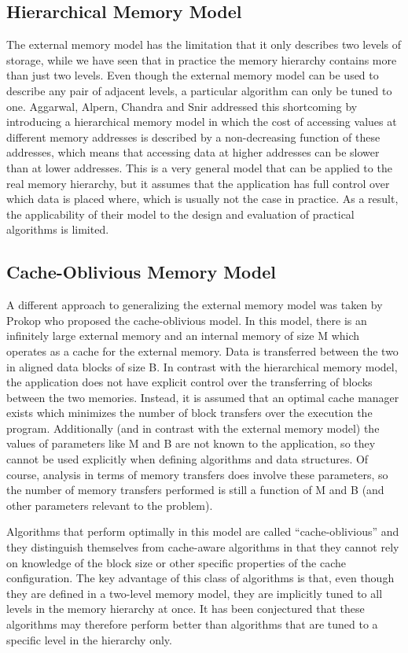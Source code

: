 \documentclass{acm_proc_article-sp}
\begin{document}
\subsection{Hierarchical Memory Model}
The external memory model has the limitation that it only describes two levels of storage, while we have seen that in practice the memory hierarchy contains more than just two levels. Even though the external memory model can be used to describe any pair of adjacent levels, a particular algorithm can only be tuned to one.
Aggarwal, Alpern, Chandra and Snir \cite{aggarwal1987mhm} addressed this
shortcoming by introducing a hierarchical memory model in which the cost of
accessing values at different memory addresses is described by a non-decreasing
function of these addresses, which means that accessing data at higher
addresses can be slower than at lower addresses.
This is a very general model that can be applied to the real memory hierarchy,
but it assumes that the application has full control over which data is placed
where, which is usually not the case in practice.
As a result, the applicability of their model to the design and evaluation of
practical algorithms is limited.

\subsection{Cache-Oblivious Memory Model}
A different approach to generalizing the external memory model was taken by Prokop \cite{prokop1999coa} who proposed the cache-oblivious model.
In this model, there is an infinitely large external memory and an internal memory of size M which operates as a cache for the external memory.
Data is transferred between the two in aligned data blocks of size B.
In contrast with the hierarchical memory model, the application does not have explicit control over the transferring of blocks between the two memories.
Instead, it is assumed that an optimal cache manager exists which minimizes the number of block transfers over the execution the program.
Additionally (and in contrast with the external memory model) the values of parameters like M and B are not known to the application, so they cannot be used explicitly when defining algorithms and data structures.
Of course, analysis in terms of memory transfers does involve these parameters, so the number of memory transfers performed is still a function of M and B (and other parameters relevant to the problem).

Algorithms that perform optimally in this model are called ``cache-oblivious'' and they distinguish themselves from cache-aware algorithms in that they cannot rely on knowledge of the block size or other specific properties of the cache configuration. The key advantage of this class of algorithms is that, even though they are defined in a two-level memory model, they are implicitly tuned to all levels in the memory hierarchy at once. It has been conjectured that these algorithms may therefore perform better than algorithms that are tuned to a specific level in the hierarchy only.
\end{document}
